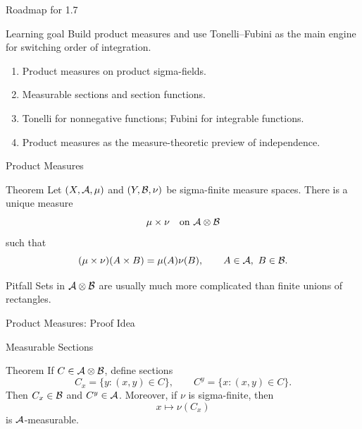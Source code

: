 \begin{frame}{Roadmap for 1.7}
  \begin{block}{Learning goal}
    Build product measures and use Tonelli--Fubini as the main engine for switching order of integration.
  \end{block}
  \begin{enumerate}
    \item Product measures on product sigma-fields.
    \item Measurable sections and section functions.
    \item Tonelli for nonnegative functions; Fubini for integrable functions.
    \item Product measures as the measure-theoretic preview of independence.
  \end{enumerate}
\end{frame}

\begin{frame}{Product Measures}
  \begin{block}{Theorem}
    Let $(X,\mathcal{A},\mu)$ and $(Y,\mathcal{B},\nu)$ be sigma-finite measure spaces. There is a unique measure
    \[
      \mu\times\nu \quad \text{on } \mathcal{A}\otimes\mathcal{B}
    \]
    such that
    \[
      (\mu\times\nu)(A\times B)=\mu(A)\nu(B),
      \qquad A\in\mathcal{A},\ B\in\mathcal{B}.
    \]
  \end{block}
  \begin{alertblock}{Pitfall}
    Sets in $\mathcal{A}\otimes\mathcal{B}$ are usually much more complicated than finite unions of rectangles.
  \end{alertblock}
\end{frame}

\begin{frame}{Product Measures: Proof Idea}
\end{frame}

\begin{frame}{Measurable Sections}
  \begin{block}{Theorem}
    If $C\in\mathcal{A}\otimes\mathcal{B}$, define sections
    \[
      C_x=\{y:(x,y)\in C\},\qquad C^y=\{x:(x,y)\in C\}.
    \]
    Then $C_x\in\mathcal{B}$ and $C^y\in\mathcal{A}$. Moreover, if $\nu$ is sigma-finite, then
    \[
      x\mapsto \nu(C_x)
    \]
    is $\mathcal{A}$-measurable.
  \end{block}
\end{frame}

